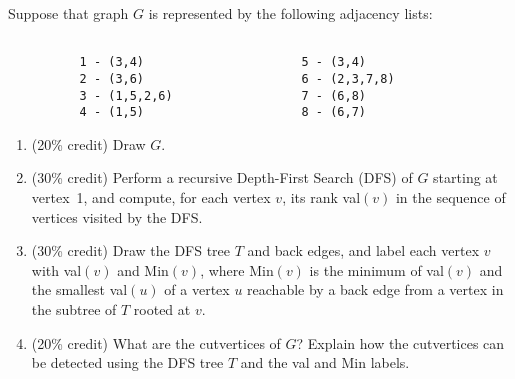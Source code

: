 Suppose that graph $G$ is represented by the following adjacency lists:

\begin{verbatim}

          1 - (3,4)                      5 - (3,4)         
          2 - (3,6)                      6 - (2,3,7,8)
          3 - (1,5,2,6)                  7 - (6,8)
          4 - (1,5)                      8 - (6,7)

\end{verbatim}

\begin{enumerate}

\item    (20\%  credit) Draw $G$.

\item      (30\%  credit) Perform a recursive Depth-First Search (DFS) of
$G$ starting at vertex~1, and compute, for each vertex $v$, its rank
val$(v)$ in the sequence of vertices visited by the DFS.

\item    (30\%  credit) Draw the DFS tree $T$ and back edges, and label
each vertex $v$ with val$(v)$ and Min$(v)$, where Min$(v)$ is the
minimum of val$(v)$ and the smallest val$(u)$ of a vertex $u$ reachable
by a back edge from a vertex in the subtree of $T$ rooted at $v$.

\item    (20\%  credit) What are the cutvertices of $G$?  Explain how the
cutvertices can be detected using the DFS tree $T$ and the val and Min
labels.

\end{enumerate}
